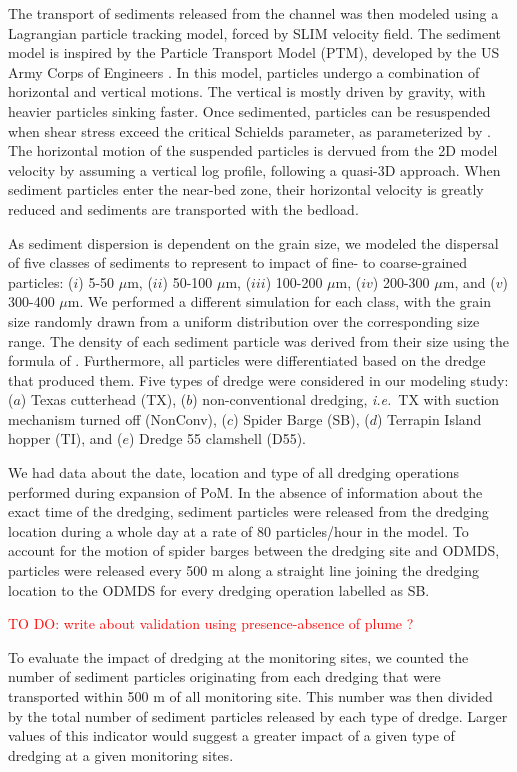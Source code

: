 \documentclass[preprint,12pt,authoryear]{elsarticle}
\newcommand{\ie}{{\it i.e.}\ }
\newcommand{\todo}[1]{\textcolor{red}{TO DO: #1}}
\begin{document}
The transport of sediments released from the channel was then modeled using a Lagrangian particle tracking model, forced by SLIM velocity field. The sediment model is inspired by the Particle Transport Model (PTM), developed by the US Army Corps of Engineers \citep{macdonald2006ptm}. In this model, particles undergo a combination of horizontal and vertical motions. The vertical is mostly driven by gravity, with heavier particles sinking faster. Once sedimented, particles can be resuspended when shear stress exceed the critical Schields parameter, as parameterized by \cite{soulsby1997threshold}. The horizontal motion of the suspended particles is dervued from the 2D model velocity by assuming a vertical log profile, following a quasi-3D approach. When sediment particles enter the near-bed zone, their horizontal velocity is greatly reduced and sediments are transported with the bedload.

As sediment dispersion is dependent on the grain size, we modeled the dispersal of five classes of sediments to represent to impact of fine- to coarse-grained particles: ($i$) 5-50 $\mu$m, ($ii$) 50-100 $\mu$m, ($iii$) 100-200 $\mu$m, ($iv$) 200-300 $\mu$m, and ($v$) 300-400 $\mu$m. We performed a  different simulation for each class, with the grain size randomly drawn from a uniform distribution over the corresponding size range. The density of each sediment particle was derived from their size using the formula of \cite{hamilton1982sound}. Furthermore, all particles were differentiated based on the dredge that produced them. Five types of dredge were considered in our modeling study: ($a$) Texas cutterhead (TX), ($b$) non-conventional dredging, \ie TX with suction mechanism turned off (NonConv), ($c$) Spider Barge (SB), ($d$) Terrapin Island hopper (TI), and ($e$) Dredge 55 clamshell (D55).

We had data about the date, location and type of all dredging operations performed during expansion of PoM. In the absence of information about the exact time of the dredging, sediment particles were released from the dredging location during a whole day at a rate of 80 particles/hour in the model. To account for the motion of spider barges between the dredging site and ODMDS, particles were released every 500 m along a straight line joining the dredging location to the ODMDS for every dredging operation labelled as SB. 

\todo{write about validation using presence-absence of plume ?}

To evaluate the impact of dredging at the monitoring sites, we counted the number of sediment particles originating from each dredging that were transported within 500 m of all monitoring site. This number was then divided by the total number of sediment particles released by each type of dredge. Larger values of this indicator would suggest a greater impact of a given type of dredging at a given monitoring sites.
\end{document}

